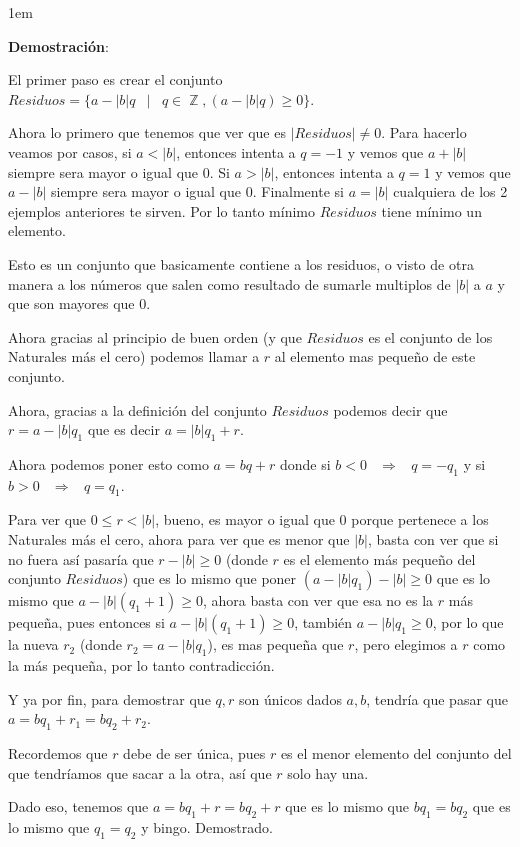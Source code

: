 \documentclass[12pt, fleqn]{report}                             %
\newenvironment{SmallIndentation}[1][0.75em]                    %
    {\begin{adjustwidth}{#1}{}\begin{footnotesize}}                 %
    {\end{footnotesize}\end{adjustwidth}}                           %
\DeclareMathOperator \Space {\quad}                             %
\DeclareMathOperator \MiniSpace {\;}                            %
\newcommand \Such {\MiniSpace|\MiniSpace}                       %
\newcommand \lequal {\MiniSpace \Leftrightarrow \MiniSpace}     %
\newcommand \linfire {\MiniSpace \Rightarrow \MiniSpace}        %
\DeclareMathOperator \Integers  {\mathbb{Z}}                     %
\begin{document}
            \begin{SmallIndentation}[1em]
                \textbf{Demostración}:

                El primer paso es crear el conjunto
                $Residuos = \{a-|b|q \Such q \in \Integers, (a-|b|q) \geq 0 \}$.

                Ahora lo primero que tenemos que ver que es $|Residuos| \neq 0$. Para hacerlo
                veamos por casos, si $a < |b|$, entonces intenta a $q=-1$ y vemos que $a+|b|$
                siempre sera mayor o igual que $0$.
                Si $a > |b|$, entonces intenta a $q=1$ y vemos que $a-|b|$ siempre sera mayor
                o igual que $0$.
                Finalmente si $a = |b|$ cualquiera de los 2 ejemplos anteriores te sirven.
                Por lo tanto mínimo $Residuos$ tiene mínimo un elemento.

                Esto es un conjunto que basicamente contiene a los residuos, o visto de otra
                manera a los números que salen como resultado de sumarle multiplos de $|b|$ a $a$
                y que son mayores que 0.

                Ahora gracias al principio de buen orden (y que $Residuos$ es el conjunto
                de los Naturales más el cero) podemos llamar a $r$ al elemento mas pequeño
                de este conjunto.

                Ahora, gracias a la definición del conjunto $Residuos$ podemos decir que
                $r=a-|b|q_1$ que es decir $a=|b|q_1+r$.

                Ahora podemos poner esto como $a=bq+r$ donde si $b<0 \linfire q = -q_1$ y si
                $b>0 \linfire q=q_1$.

                Para ver que $0 \leq r < |b|$, bueno, es mayor o igual que $0$ porque pertenece a los
                Naturales más el cero, ahora para ver que es menor que $|b|$, basta con ver que si no
                fuera así  pasaría que $r-|b| \geq 0$ (donde $r$ es el elemento más pequeño del conjunto
                $Residuos$) que es lo mismo que poner $(a-|b|q_1)-|b| \geq 0$ que es lo mismo que
                $a-|b|(q_1+1)\geq 0$, ahora basta con ver que esa no es la $r$ más pequeña,
                pues entonces si $a-|b|(q_1+1)\geq 0$, también $a-|b|q_1\geq 0$, por lo que la nueva $r_2$
                (donde $r_2 = a-|b|q_1$), es mas pequeña que $r$, pero elegimos a $r$ como la más pequeña,
                por lo tanto contradicción.

                Y ya por fin, para demostrar que $q, r$ son únicos dados $a, b$, tendría que pasar
                que $a=bq_1+r_1=bq_2+r_2$.

                Recordemos que $r$ debe de ser única, pues $r$ es el menor elemento del conjunto
                del que tendríamos que sacar a la otra, así que $r$ solo hay una.

                Dado eso, tenemos que $a=bq_1+r=bq_2+r$ que es lo mismo que $bq_1=bq_2$
                que es lo mismo que $q_1=q_2$ y bingo. Demostrado.

            \end{SmallIndentation}
\end{document}
